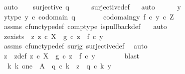 \begin{isabellebody}
\ auto\isanewline
\ \ \isamarkupfalse%
\ {\isachardoublequoteopen}surjective\ {\isacharparenleft}{\kern0pt}q{}{\isacharparenright}{\kern0pt}{\isachardoublequoteclose}\isanewline
\ \ \ \ \isamarkupfalse%
\ surjective{\isacharunderscore}{\kern0pt}def\isanewline
\ \ \isamarkupfalse%
{\isacharparenleft}{\kern0pt}auto{\isacharparenright}{\kern0pt}\isanewline
\ \ \ \ \isamarkupfalse%
\ y\isanewline
\ \ \ \ \isamarkupfalse%
\ y{\isacharunderscore}{\kern0pt}type{\isacharcolon}{\kern0pt}\ {\isachardoublequoteopen}y\ {\isasymin}\isactrlsub c\ codomain\ q{}{\isachardoublequoteclose}\isanewline
\ \ \ \ \isamarkupfalse%
\ \isamarkupfalse%
\ codomain{\isacharunderscore}{\kern0pt}gy{\isacharcolon}{\kern0pt}\ {\isachardoublequoteopen}f\ {\isasymcirc}\isactrlsub c\ y\ {\isasymin}\isactrlsub c\ Z{\isachardoublequoteclose}\isanewline
\ \ \ \ \ \ \isamarkupfalse%
\ assms{\isacharparenleft}{\kern0pt}{}{\isacharparenright}{\kern0pt}\ cfunc{\isacharunderscore}{\kern0pt}type{\isacharunderscore}{\kern0pt}def\ comp{\isacharunderscore}{\kern0pt}type\ is{\isacharunderscore}{\kern0pt}pullback{\isacharunderscore}{\kern0pt}def\ \ \isamarkupfalse%
\ auto\isanewline
\ \ \ \ \isamarkupfalse%
\ \isamarkupfalse%
\ z{\isacharunderscore}{\kern0pt}exists{\isacharcolon}{\kern0pt}\ {\isachardoublequoteopen}{\isasymexists}\ z{\isachardot}{\kern0pt}\ z\ {\isasymin}\isactrlsub c\ X\ {\isasymand}\ g\ {\isasymcirc}\isactrlsub c\ z\ {\isacharequal}{\kern0pt}\ f\ {\isasymcirc}\isactrlsub c\ y{\isachardoublequoteclose}\isanewline
\ \ \ \ \ \ \isamarkupfalse%
\ assms{\isacharparenleft}{\kern0pt}{}{\isacharparenright}{\kern0pt}\ cfunc{\isacharunderscore}{\kern0pt}type{\isacharunderscore}{\kern0pt}def\ surj{\isacharunderscore}{\kern0pt}g\ surjective{\isacharunderscore}{\kern0pt}def\ \isamarkupfalse%
\ auto\isanewline
\ \ \ \ \isamarkupfalse%
\ \isamarkupfalse%
\ z\ \ z{\isacharunderscore}{\kern0pt}def{\isacharcolon}{\kern0pt}\ {\isachardoublequoteopen}z\ {\isasymin}\isactrlsub c\ X\ {\isasymand}\ g\ {\isasymcirc}\isactrlsub c\ z\ {\isacharequal}{\kern0pt}\ f\ {\isasymcirc}\isactrlsub c\ y{\isachardoublequoteclose}\isanewline
\ \ \ \ \ \ \isamarkupfalse%
\ blast\isanewline
\ \ \ \ \isamarkupfalse%
\ \isamarkupfalse%
\ {\isachardoublequoteopen}{\isasymexists}{\isacharbang}{\kern0pt}\ k{\isachardot}{\kern0pt}\ k{\isacharcolon}{\kern0pt}\ one\ {\isasymrightarrow}\ A\ {\isasymand}\ q{}\ {\isasymcirc}\isactrlsub c\ k\ {\isacharequal}{\kern0pt}\ z\ {\isasymand}\ q{}\ {\isasymcirc}\isactrlsub c\ k\ {\isacharequal}{\kern0pt}y{\isachardoublequoteclose}\isanewline

\end{isabellebody}
